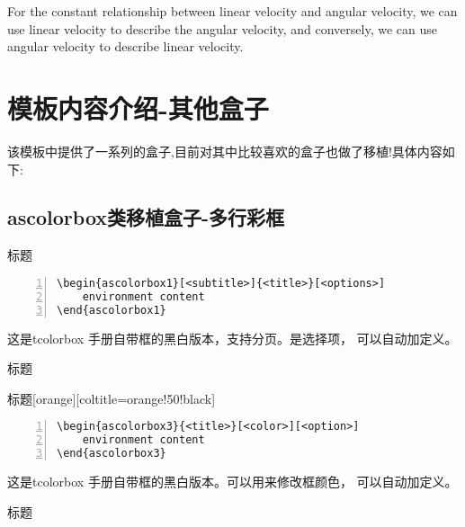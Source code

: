 \begin{tcblisting}{}
\begin{marker}
    For the constant relationship between linear velocity and angular velocity, we can use linear velocity to describe the angular velocity, and conversely, we can use angular velocity to describe linear velocity.
\end{marker}
\end{tcblisting}

\section{模板内容介绍-其他盒子}
该模板中提供了一系列的盒子,目前对其中比较喜欢的盒子也做了移植!具体内容如下:
\subsection{ascolorbox类移植盒子-多行彩框}

\begin{ascolorbox1}[子标题]{标题}
\zhlipsum[1]
\end{ascolorbox1}
\begin{lstlisting}[backgroundcolor=\color{gray!5},framerule=1pt,frame=tb,numbers=left,
    numberstyle=\tiny\color{black},]
\begin{ascolorbox1}[<subtitle>]{<title>}[<options>]
    environment content
\end{ascolorbox1}
\end{lstlisting}
这是tcolorbox 手册自带框的黑白版本，支持分页。\md{[⟨subtitle⟩]}是选择项，\md{[⟨option⟩]} 可以自动加定义。

\begin{ascolorbox3}{标题}
    \zhlipsum[1]
\end{ascolorbox3}

\begin{ascolorbox3}{标题}[orange][coltitle=orange!50!black]
    \zhlipsum[1]
\end{ascolorbox3}
\begin{lstlisting}[backgroundcolor=\color{gray!5},framerule=1pt,frame=tb,numbers=left,
    numberstyle=\tiny\color{black},]
\begin{ascolorbox3}{<title>}[<color>][<option>]
    environment content
\end{ascolorbox3}
\end{lstlisting}
这是tcolorbox 手册自带框的黑白版本。可以用来修改框颜色， 可以自动加定义。

\begin{ascolorbox4}[子标题]{标题}
    \zhlipsum[1]
\end{ascolorbox4}

